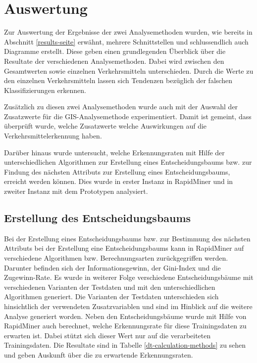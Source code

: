 \chapter{Auswertung}
\label{auswertung}

Zur Auswertung der Ergebnisse der zwei Analysemethoden wurden, wie bereits in Abschnitt \ref{results-seite}   erwähnt, mehrere Schnittstellen und schlussendlich auch Diagramme erstellt. Diese geben einen grundlegenden Überblick über die Resultate der verschiedenen Analysemethoden. Dabei wird zwischen den Gesamtwerten sowie einzelnen Verkehrsmitteln unterschieden. Durch die Werte zu den einzelnen Verkehrsmitteln lassen sich Tendenzen bezüglich der falschen Klassifizierungen erkennen. 
 
Zusätzlich zu diesen zwei Analysemethoden wurde auch mit der Auswahl der Zusatzwerte für die GIS-Analysemethode experimentiert. Damit ist gemeint, dass überprüft wurde, welche Zusatzwerte welche Auswirkungen auf die Verkehrsmittelerkennung haben. 

Darüber hinaus wurde untersucht, welche Erkennungsraten mit Hilfe der unterschiedlichen Algorithmen zur Erstellung eines Entscheidungsbaums bzw. zur Findung des nächsten Attributs zur Erstellung eines Entscheidungsbaums, erreicht werden können. Dies wurde in erster Instanz in RapidMiner und in zweiter Instanz mit dem Prototypen analysiert.
\clearpage

\section{Erstellung des Entscheidungsbaums}
\label{rapidMinerResultat}
Bei der Erstellung eines Entscheidungsbaums bzw. zur Bestimmung des nächsten Attributs bei der Erstellung eine Entscheidungsbaums kann in RapidMiner auf verschiedene Algorithmen bzw. Berechnungsarten zurückgegriffen werden. Darunter befinden sich der Informationsgewinn, der Gini-Index und die Zugewinn-Rate. Es wurde in weiterer Folge verschiedene Entscheidungsbäume mit verschiedenen Varianten der Testdaten und mit den unterschiedlichen Algorithmen generiert. Die Varianten der Testdaten unterschieden sich hinsichtlich der verwendeten Zusatzvariablen und sind im Hinblick auf die weitere Analyse generiert worden. Neben den Entscheidungsbäume wurde mit Hilfe von RapidMiner auch berechnet, welche Erkennungsrate für diese Trainingsdaten zu erwarten ist. Dabei stützt sich dieser Wert nur auf die verarbeiteten Trainingsdaten. Die Resultate sind in Tabelle \ref{dt-calculation-methods} zu sehen und geben Auskunft über die zu erwartende Erkennungsraten. 

